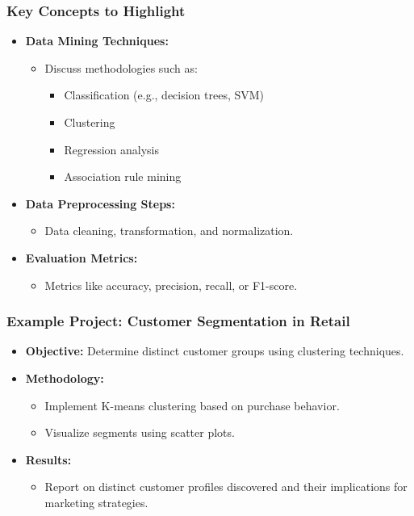 \documentclass[aspectratio=169]{beamer}
\begin{document}
\begin{frame}[fragile]
    \frametitle{Key Concepts to Highlight}
    \begin{itemize}
        \item \textbf{Data Mining Techniques:}
            \begin{itemize}
                \item Discuss methodologies such as:
                \begin{itemize}
                    \item Classification (e.g., decision trees, SVM)
                    \item Clustering
                    \item Regression analysis
                    \item Association rule mining
                \end{itemize}
            \end{itemize}

        \item \textbf{Data Preprocessing Steps:}
            \begin{itemize}
                \item Data cleaning, transformation, and normalization.
            \end{itemize}

        \item \textbf{Evaluation Metrics:}
            \begin{itemize}
                \item Metrics like accuracy, precision, recall, or F1-score.
            \end{itemize}
    \end{itemize}
\end{frame}

\begin{frame}[fragile]
    \frametitle{Example Project: Customer Segmentation in Retail}
    \begin{itemize}
        \item \textbf{Objective:} Determine distinct customer groups using clustering techniques.
        \item \textbf{Methodology:}
            \begin{itemize}
                \item Implement K-means clustering based on purchase behavior.
                \item Visualize segments using scatter plots.
            \end{itemize}
        \item \textbf{Results:} 
            \begin{itemize}
                \item Report on distinct customer profiles discovered and their implications for marketing strategies.
            \end{itemize}
    \end{itemize}
\end{frame}
\end{document}
